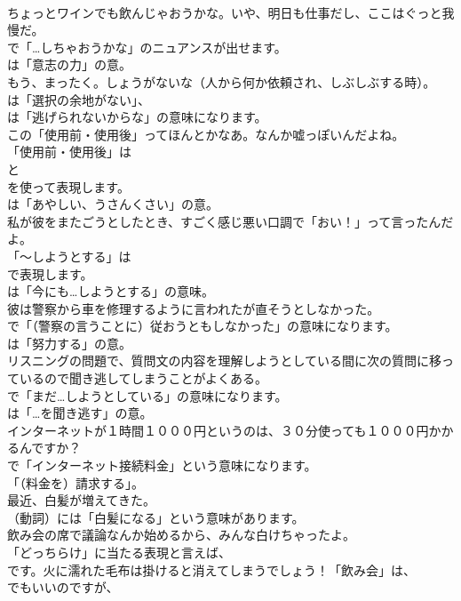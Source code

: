 \documentclass[8pt]{extreport}
\begin{document}
\begin{CJK}{UTF8}{min}
\\	ちょっとワインでも飲んじゃおうかな。いや、明日も仕事だし、ここはぐっと我慢だ。 
\\	で「…しちゃおうかな」のニュアンスが出せます。
\\	は「意志の力」の意。	
\\	もう、まったく。しょうがないな（人から何か依頼され、しぶしぶする時）。 
\\	は「選択の余地がない」、
\\	は「逃げられないからな」の意味になります。	
\\	この「使用前・使用後」ってほんとかなあ。なんか嘘っぽいんだよね。 
\\	「使用前・使用後」は
\\	と
\\	を使って表現します。
\\	は「あやしい、うさんくさい」の意。	
\\	私が彼をまたごうとしたとき、すごく感じ悪い口調で「おい！」って言ったんだよ。 
\\	「～しようとする」は 
\\	で表現します。
\\	は「今にも…しようとする」の意味。	
\\	彼は警察から車を修理するように言われたが直そうとしなかった。 
\\	で「（警察の言うことに）従おうともしなかった」の意味になります。
\\	は「努力する」の意。	
\\	リスニングの問題で、質問文の内容を理解しようとしている間に次の質問に移っているので聞き逃してしまうことがよくある。 
\\	で「まだ…しようとしている」の意味になります。
\\	は「…を聞き逃す」の意。	
\\	インターネットが１時間１０００円というのは、３０分使っても１０００円かかるんですか？ 
\\	で「インターネット接続料金」という意味になります。
\\	「（料金を）請求する」。	
\\	最近、白髪が増えてきた。 
\\	（動詞）には「白髪になる」という意味があります。	
\\	飲み会の席で議論なんか始めるから、みんな白けちゃったよ。 
\\	「どっちらけ」に当たる表現と言えば、
\\	です。火に濡れた毛布は掛けると消えてしまうでしょう！「飲み会」は、
\\	でもいいのですが、

\end{CJK}
\end{document}
